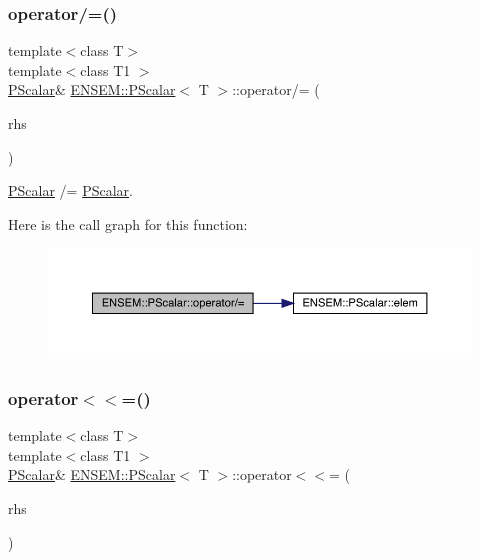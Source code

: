 \subsubsection{\texorpdfstring{operator/=()}{operator/=()}\hspace{0.1cm}{\footnotesize\ttfamily [2/2]}}
{\footnotesize\ttfamily template$<$class T$>$ \\
template$<$class T1 $>$ \\
\mbox{\hyperlink{classENSEM_1_1PScalar}{P\+Scalar}}\& \mbox{\hyperlink{classENSEM_1_1PScalar}{E\+N\+S\+E\+M\+::\+P\+Scalar}}$<$ T $>$\+::operator/= (\begin{DoxyParamCaption}\item[{const \mbox{\hyperlink{classENSEM_1_1PScalar}{P\+Scalar}}$<$ T1 $>$ \&}]{rhs }\end{DoxyParamCaption})\hspace{0.3cm}{\ttfamily [inline]}}



\mbox{\hyperlink{classENSEM_1_1PScalar}{P\+Scalar}} /= \mbox{\hyperlink{classENSEM_1_1PScalar}{P\+Scalar}}. 

Here is the call graph for this function\+:
\nopagebreak
\begin{figure}[H]
\begin{center}
\leavevmode
\includegraphics[width=350pt]{d3/d27/classENSEM_1_1PScalar_a72bf5e7494fc6c8831d0003f8fb62a16_cgraph}
\end{center}
\end{figure}
\mbox{\label{classENSEM_1_1PScalar_ade643675ab6ef041676e1098ac740b29}} 
\subsubsection{\texorpdfstring{operator$<$$<$=()}{operator<<=()}\hspace{0.1cm}{\footnotesize\ttfamily [1/2]}}
{\footnotesize\ttfamily template$<$class T$>$ \\
template$<$class T1 $>$ \\
\mbox{\hyperlink{classENSEM_1_1PScalar}{P\+Scalar}}\& \mbox{\hyperlink{classENSEM_1_1PScalar}{E\+N\+S\+E\+M\+::\+P\+Scalar}}$<$ T $>$\+::operator$<$$<$= (\begin{DoxyParamCaption}\item[{const \mbox{\hyperlink{classENSEM_1_1PScalar}{P\+Scalar}}$<$ T1 $>$ \&}]{rhs }\end{DoxyParamCaption})\hspace{0.3cm}{\ttfamily [inline]}}



